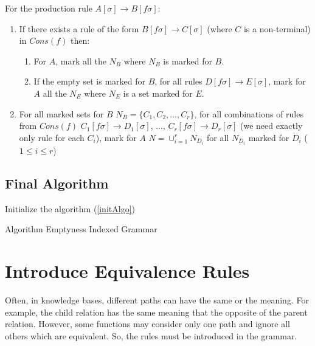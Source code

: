 \documentclass[10pt,a4paper,draft]{article}
\begin{document}
For the production rule $A[\sigma] \rightarrow B[f \sigma]$:
\begin{enumerate}
\item If there exists a rule of the form $B[f \sigma] \rightarrow C[\sigma]$ (where $C$ is a non-terminal) in $Cons(f)$ then:
\begin{enumerate}
\item For $A$, mark all the $N_B$ where $N_B$ is marked for $B$.
\item If the empty set is marked for $B$, for all rules $D[f \sigma] \rightarrow E[\sigma]$, mark for $A$ all the $N_E$ where $N_E$ is a set marked for $E$.
\end{enumerate}
\item For all marked sets for $B$ $N_B = \{C_1, C_2, ..., C_r\}$, for all combinations of rules from $Cons(f)$ $C_1[f \sigma] \rightarrow D_1[\sigma]$, ..., $C_r[f \sigma] \rightarrow D_r[\sigma]$ (we need exactly only rule for each $C_i$), mark for $A$ $N = \cup_{i=1}^{r} N_{D_i}$ for all $N_{D_i}$ marked for $D_i$ ($1 \leq i \leq r$)
\end{enumerate}

\subsection{Final Algorithm}

\begin{algorithm}[H]
\SetAlgoLined
{}
Initialize the algorithm (\ref{initAlgo})\;
 \caption{Algorithm Emptyness Indexed Grammar}
 \label{algoEmptyness}
\end{algorithm}

\section{Introduce Equivalence Rules}

Often, in knowledge bases, different paths can have the same or the meaning. For example, the child relation has the same meaning that the opposite of the parent relation. However, some functions may consider only one path and ignore all others which are equivalent. So, the rules must be introduced in the grammar.
\end{document}
